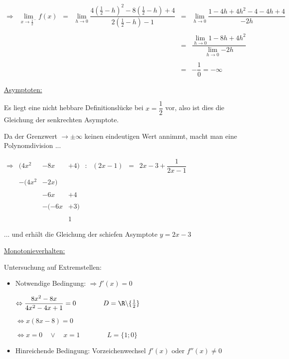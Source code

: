 \documentclass[main.tex]{subfiles}
\begin{document}
$\begin{array}{rccccl}
	\Rightarrow &  \lim\limits_{x \rightarrow {\frac{1}{2}}^{-}} {f(x)} &=& \lim\limits_{h \rightarrow 0} {\dfrac{4(\frac{1}{2} -h)^2 -8(\frac{1}{2} -h) +4}{2(\frac{1}{2}-h) -1} } &=& \lim\limits_{h \rightarrow 0} \dfrac{1-4h+4h^2-4-4h+4}{-2h} \\ \\
	&&&&=& \dfrac{\lim\limits_{h \rightarrow 0} {1-8h+4h^2} }{\lim\limits_{h \rightarrow 0}{-2h}} \\ \\
	&&&&=& -\dfrac {1}{0} = - \infty
\end{array}$

\underline{Asymptoten:}

Es liegt eine nicht hebbare Definitionslücke bei $x=\dfrac{1}{2}$ vor, also ist dies die Gleichung der senkrechten Asymptote.

Da der Grenzwert $\rightarrow \pm \infty$ keinen eindeutigen Wert annimmt, macht man eine Polynomdivision ...

$\begin{array}{rccccccl}
	\Rightarrow & (4x^2 & -8x & +4) & : & (2x-1) &=& 2x-3+\dfrac{1}{2x-1} \\ \\
	& -(4x^2 & -2x) & & & & & \\ \\
	& & -6x & +4 & & & & \\ \\
	& & -(-6x & +3) & & & & \\ \\
	& & & 1 & & & &
\end{array}$

... und erhält die Gleichung der schiefen Asymptote $y = 2x-3$

\underline{Monotonieverhalten:}

Untersuchung auf Extremstellen:
\begin{itemize}
\item Notwendige Bedingung: $\Rightarrow f'(x)=0$

	$\Leftrightarrow \dfrac{8x^2-8x}{4x^2-4x+1}=0 \qquad \qquad D=\R \backslash \{ \frac{1}{2} \}$

	$\Leftrightarrow x(8x-8)=0$

	$\Leftrightarrow x=0 \quad \lor \quad x=1 \qquad \qquad L=\{1;0\}$

\item Hinreichende Bedingung: Vorzeichenwechsel $f'(x)$ oder $f''(x)\neq 0$


\end{itemize}
\end{document}
